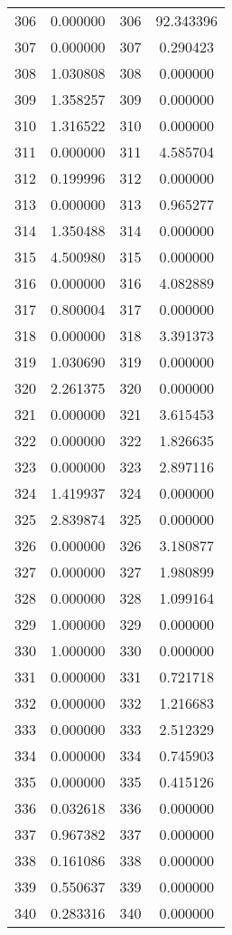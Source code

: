 \documentclass[12pt]{article}
\begin{document}
\begin{longtable}{@{}cccc@{}}
306 & 0.000000 & 306 & 92.343396 \\
307 & 0.000000 & 307 & 0.290423 \\
308 & 1.030808 & 308 & 0.000000 \\
309 & 1.358257 & 309 & 0.000000 \\
310 & 1.316522 & 310 & 0.000000 \\
311 & 0.000000 & 311 & 4.585704 \\
312 & 0.199996 & 312 & 0.000000 \\
313 & 0.000000 & 313 & 0.965277 \\
314 & 1.350488 & 314 & 0.000000 \\
315 & 4.500980 & 315 & 0.000000 \\
316 & 0.000000 & 316 & 4.082889 \\
317 & 0.800004 & 317 & 0.000000 \\
318 & 0.000000 & 318 & 3.391373 \\
319 & 1.030690 & 319 & 0.000000 \\
320 & 2.261375 & 320 & 0.000000 \\
321 & 0.000000 & 321 & 3.615453 \\
322 & 0.000000 & 322 & 1.826635 \\
323 & 0.000000 & 323 & 2.897116 \\
324 & 1.419937 & 324 & 0.000000 \\
325 & 2.839874 & 325 & 0.000000 \\
326 & 0.000000 & 326 & 3.180877 \\
327 & 0.000000 & 327 & 1.980899 \\
328 & 0.000000 & 328 & 1.099164 \\
329 & 1.000000 & 329 & 0.000000 \\
330 & 1.000000 & 330 & 0.000000 \\
331 & 0.000000 & 331 & 0.721718 \\
332 & 0.000000 & 332 & 1.216683 \\
333 & 0.000000 & 333 & 2.512329 \\
334 & 0.000000 & 334 & 0.745903 \\
335 & 0.000000 & 335 & 0.415126 \\
336 & 0.032618 & 336 & 0.000000 \\
337 & 0.967382 & 337 & 0.000000 \\
338 & 0.161086 & 338 & 0.000000 \\
339 & 0.550637 & 339 & 0.000000 \\
340 & 0.283316 & 340 & 0.000000 \\

\end{longtable}
\end{document}
